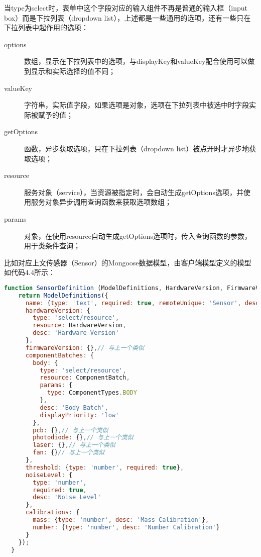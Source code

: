 当type为select时，表单中这个字段对应的输入组件不再是普通的输入框（input box）而是下拉列表（dropdown list），上述都是一些通用的选项，还有一些只在下拉列表中起作用的选项：
\begin{description}
  \item[options] 数组，显示在下拉列表中的选项，与displayKey和valueKey配合使用可以做到显示和实际选择的值不同；
  \item[valueKey] 字符串，实际值字段，如果选项是对象，选项在下拉列表中被选中时字段实际被赋予的值；
  \item[getOptions] 函数，异步获取选项，只在下拉列表（dropdown list）被点开时才异步地获取选项；
  \item[resource] 服务对象（service），当资源被指定时，会自动生成getOptions选项，并使用服务对象异步调用查询函数来获取选项数组；
  \item[params] 对象，在使用resource自动生成getOptions选项时，传入查询函数的参数，用于类条件查询；
\end{description}

比如对应上文传感器（Sensor）的Mongoose数据模型，由客户端模型定义的模型如代码4.4所示：
\begin{lstlisting}[language={JavaScript}, caption={Sensor的客户端模型}]
function SensorDefinition (ModelDefinitions, HardwareVersion, FirmwareVersion, ComponentBatch, ComponentTypes) {
    return ModelDefinitions({
      name: {type: 'text', required: true, remoteUnique: 'Sensor', desc: 'ID'},
      hardwareVersion: {
        type: 'select/resource',
        resource: HardwareVersion,
        desc: 'Hardware Version'
      },
      firmwareVersion: {},// 与上一个类似
      componentBatches: {
        body: {
          type: 'select/resource',
          resource: ComponentBatch,
          params: {
            type: ComponentTypes.BODY
          },
          desc: 'Body Batch',
          displayPriority: 'low'
        },
        pcb: {},// 与上一个类似
        photodiode: {},// 与上一个类似
        laser: {},// 与上一个类似
        fan: {}// 与上一个类似
      },
      threshold: {type: 'number', required: true},
      noiseLevel: {
        type: 'number',
        required: true,
        desc: 'Noise Level'
      },
      calibrations: {
        mass: {type: 'number', desc: 'Mass Calibration'},
        number: {type: 'number', desc: 'Number Calibration'}
      }
    });
  }
\end{lstlisting}

